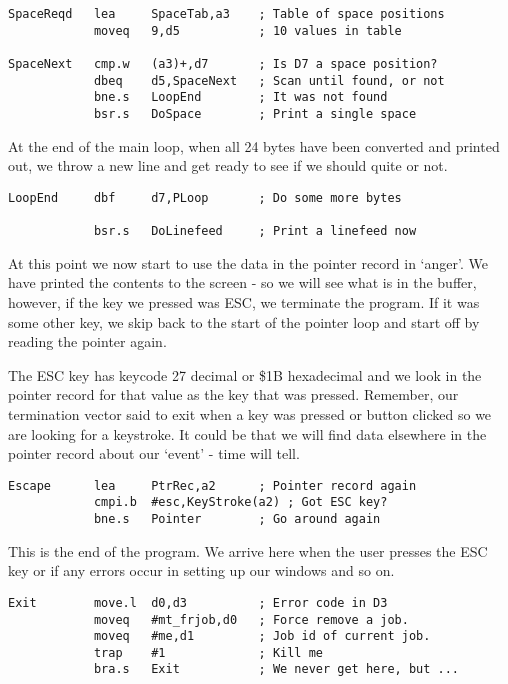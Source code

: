 \begin{lstlisting}[firstnumber=last,caption={Pointer Record Examiner - Space Table}]
SpaceReqd   lea     SpaceTab,a3    ; Table of space positions
            moveq   9,d5           ; 10 values in table

SpaceNext   cmp.w   (a3)+,d7       ; Is D7 a space position?
            dbeq    d5,SpaceNext   ; Scan until found, or not
            bne.s   LoopEnd        ; It was not found
            bsr.s   DoSpace        ; Print a single space
\end{lstlisting}

At the end of the main loop, when all 24 bytes have been converted and printed out, we
throw a new line and get ready to see if we should quite or not.

\begin{lstlisting}[firstnumber=last,caption={Pointer Record Examiner - Loop End}]
LoopEnd     dbf     d7,PLoop       ; Do some more bytes
            
            bsr.s   DoLinefeed     ; Print a linefeed now
\end{lstlisting}

At this point we now start to use the data in the pointer record in `anger'. We have
printed the contents to the screen -{} so we will see what is in the buffer, however, if the
key we pressed was ESC, we terminate the program. If it was some other key, we skip back
to the start of the pointer loop and start off by reading the pointer again.

The ESC key has keycode 27 decimal or \$1B hexadecimal and we look in the pointer record
for that value as the key that was pressed. Remember, our termination vector said to exit
when a key was pressed or button clicked so we are looking for a keystroke. It could be
that we will find data elsewhere in the pointer record about our `event' -{} time will
tell.

\begin{lstlisting}[firstnumber=last,caption={Pointer Record Examiner - Handle ESC}]
Escape      lea     PtrRec,a2      ; Pointer record again
            cmpi.b  #esc,KeyStroke(a2) ; Got ESC key?
            bne.s   Pointer        ; Go around again
\end{lstlisting}

This is the end of the program. We arrive here when the user presses the ESC key or if any
errors occur in setting up our windows and so on.

\begin{lstlisting}[firstnumber=last,caption={Pointer Record Examiner - Exit Program}]
Exit        move.l  d0,d3          ; Error code in D3
            moveq   #mt_frjob,d0   ; Force remove a job.
            moveq   #me,d1         ; Job id of current job.
            trap    #1             ; Kill me
            bra.s   Exit           ; We never get here, but ...
\end{lstlisting}

